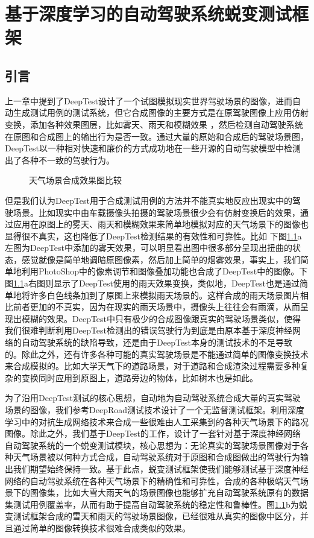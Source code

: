 \chapter{基于深度学习的自动驾驶系统蜕变测试框架}

\section{引言}

上一章中提到了DeepTest设计了一个试图模拟现实世界驾驶场景的图像，进而自动生成测试用例的测试系统，但它合成图像的主要方式是在原驾驶图像上应用仿射变换，添加各种效果图层，比如雾天、雨天和模糊效果
，然后检测自动驾驶系统在原图和合成图上的输出行为是否一致。通过大量的原始和合成后的驾驶场景图，DeepTest以一种相对快速和廉价的方式成功地在一些开源的自动驾驶模型中检测出了各种不一致的驾驶行为。

\begin{figure}[h]
    \centering
    \caption{天气场景合成效果图比较}
    \label{label-deep}
\end{figure}

但是我们认为DeepTest用于合成测试用例的方法并不能真实地反应出现实中的驾驶场景。比如现实中由车载摄像头拍摄的驾驶场景很少会有仿射变换后的效果，通过应用在原图上的雾天、雨天和模糊效果来简单地模拟对应的天气场景下的图像也显得很不真实，这也降低了DeepTest检测结果的有效性和可靠性。比如
下图\ref{label-deep}a左图为DeepTest中添加的雾天效果，可以明显看出图中很多部分呈现出扭曲的状态，感觉就像是简单地调暗原图像素，然后加上简单的烟雾效果，事实上，我们简单地利用PhotoShop中的像素调节和图像叠加功能也合成了DeepTest中的图像。下图\ref{label-deep}a右图则显示了DeepTest使用的雨天效果变换，类似地，DeepTest也是通过简单地将许多白色线条加到了原图上来模拟雨天场景的。这样合成的雨天场景图片相比前者更加的不真实，因为在现实的雨天场景中，摄像头上往往会有雨滴，从而呈现出模糊的效果。DeepTest中只有极少的合成图像跟真实的驾驶场景类似，使得我们很难判断利用DeepTest检测出的错误驾驶行为到底是由原本基于深度神经网络的自动驾驶系统的缺陷导致，还是由于DeepTest本身的测试技术的不足导致的。除此之外，还有许多各种可能的真实驾驶场景是不能通过简单的图像变换技术来合成模拟的。比如大学天气下的道路场景，对于道路和合成渲染过程需要多种复杂的变换同时应用到原图上，道路旁边的物体，比如树木也是如此。

为了沿用DeepTest测试的核心思想，自动地为自动驾驶系统合成大量的真实驾驶场景的图像，我们参考DeepRoad测试技术设计了一个无监督测试框架。利用深度学习中的对抗生成网络技术来合成一些很难由人工采集到的各种天气场景下的路况图像。除此之外，我们基于DeepTest的工作，设计了一套针对基于深度神经网络自动驾驶系统的一个蜕变测试模块，核心思想为：无论真实的驾驶场景图像对于各种天气场景被以何种方式合成，自动驾驶系统对于原图和合成图做出的驾驶行为输出我们期望始终保持一致。基于此点，蜕变测试框架使我们能够测试基于深度神经网络的自动驾驶系统在各种天气场景下的精确性和可靠性，合成的各种极端天气场景下的图像集，比如大雪大雨天气的场景图像也能够扩充自动驾驶系统原有的数据集测试用例覆盖率，从而有助于提高自动驾驶系统的稳定性和鲁棒性。图\ref{label-deep}b为蜕变测试框架合成的雪天和雨天的驾驶场景图像，已经很难从真实的图像中区分，并且通过简单的图像转换技术很难合成类似的效果。

